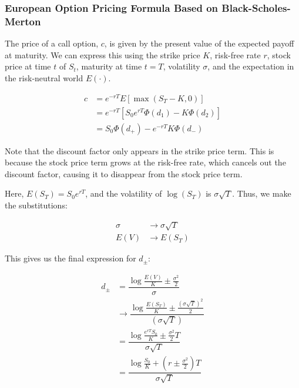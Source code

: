 \documentclass[uplatex]{jsarticle}
\begin{document}
\subsubsection{European Option Pricing Formula Based on Black-Scholes-Merton}

The price of a call option, $c$, is given by the present value of the expected payoff at maturity. We can express this using the strike price $K$, risk-free rate $r$, stock price at time $t$ of $S_{t}$, maturity at time $t=T$, volatility $\sigma$, and the expectation in the risk-neutral world $E(\cdot)$.

\begin{align}
	c & = e^{-rT} E \left[ \max(S_{T}-K,0) \right]                         \\
	  & = e^{-rT} \left[ S_{0} e^{rT} \Phi (d_{1}) - K \Phi(d_{2}) \right] \\
	  & = S_{0} \Phi (d_{+}) - e^{-rT} K \Phi(d_{-})
\end{align}

Note that the discount factor only appears in the strike price term. This is because the stock price term grows at the risk-free rate, which cancels out the discount factor, causing it to disappear from the stock price term.

Here, $E(S_{T}) = S_{0} e^{rT}$, and the volatility of $\log(S_{T})$ is $\sigma \sqrt{T}$.
Thus, we make the substitutions:

\begin{align}
	\sigma & \to \sigma \sqrt{T} \\
	E(V)   & \to E(S_T)
\end{align}

This gives us the final expression for $d_{\pm}$:

\begin{align}
	d_{\pm} & = \dfrac{ \log \frac{E(V)}{K} \pm \frac{\sigma^{2}}{2} }{ \sigma }                             \\
	        & \to \dfrac{ \log \frac{E(S_{T})}{K} \pm \frac{(\sigma \sqrt{T})^{2}}{2} }{ (\sigma \sqrt{T}) } \\
	        & = \dfrac{ \log \frac{ e^{rT} S_{0} }{K} \pm \frac{\sigma^{2}}{2}T }{ \sigma \sqrt{T} }         \\
	        & = \dfrac{ \log \frac{S_{0}}{K} + ( r \pm \frac{\sigma^{2}}{2})T }{ \sigma \sqrt{T} }
\end{align}
\end{document}
